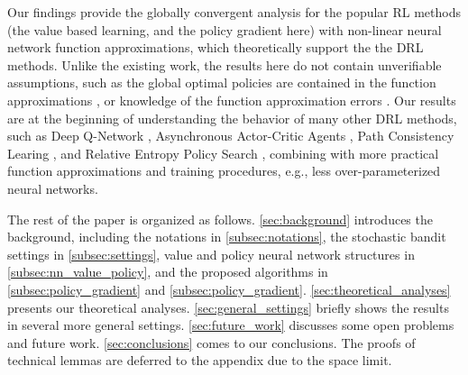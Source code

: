 Our findings provide the globally convergent analysis for the popular RL methods (the value based learning, and the policy gradient here) with non-linear neural network function approximations, which  theoretically support the  the DRL methods. Unlike the existing work, the results here do not contain unverifiable assumptions, such as the global optimal policies are contained in the function approximations \citep{krishnamurthy2016pac}, or knowledge of the function approximation errors \citep{dai2018sbeed}. Our results are at the beginning of understanding the behavior of many other DRL methods, such as Deep Q-Network \cite{mnih2015human}, Asynchronous Actor-Critic Agents \citep{mnih2016asynchronous}, Path Consistency Learing \citep{nachum2017bridging}, and Relative Entropy Policy Search \citep{peters2010relative}, combining with more practical function approximations and training procedures, e.g., less over-parameterized neural networks.

The rest of the paper is organized as follows. \cref{sec:background} introduces the background, including the notations in \cref{subsec:notations}, the stochastic bandit settings in  \cref{subsec:settings}, value and policy neural network structures in  \cref{subsec:nn_value_policy}, and the proposed algorithms in \cref{subsec:policy_gradient} and  \cref{subsec:policy_gradient}. \cref{sec:theoretical_analyses} presents our theoretical analyses. \cref{sec:general_settings} briefly shows the results in several more general settings. \cref{sec:future_work} discusses some open problems and future work. \cref{sec:conclusions} comes to our conclusions. The proofs of technical lemmas are deferred to the appendix due to the space limit.
